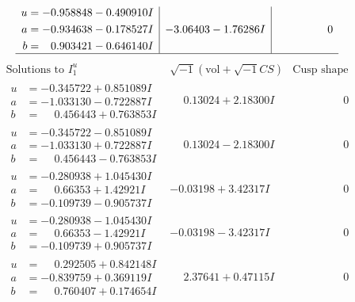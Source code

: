 \documentclass[1p]{elsarticle_modified}
\theoremstyle{definition}
\newcommand{\I}{\sqrt{-1}}
\begin{document}
$$\begin{array}{c|c|c}
\begin{aligned}
u &= -0.958848 - 0.490910 I \\
a &= -0.934638 - 0.178527 I \\
b &= \phantom{-}0.903421 - 0.646140 I\end{aligned}
 & -3.06403 - 1.76286 I & \phantom{-0.000000 } 0\\
 \hline 
 \end{array}$$\newpage$$\begin{array}{c|c|c}  
\text{Solutions to }I^u_{1}& \I (\text{vol} + \sqrt{-1}CS) & \text{Cusp shape}\\
 \hline 
\begin{aligned}
u &= -0.345722 + 0.851089 I \\
a &= -1.033130 - 0.722887 I \\
b &= \phantom{-}0.456443 + 0.763853 I\end{aligned}
 & \phantom{-}0.13024 + 2.18300 I & \phantom{-0.000000 } 0 \\ \hline\begin{aligned}
u &= -0.345722 - 0.851089 I \\
a &= -1.033130 + 0.722887 I \\
b &= \phantom{-}0.456443 - 0.763853 I\end{aligned}
 & \phantom{-}0.13024 - 2.18300 I & \phantom{-0.000000 } 0 \\ \hline\begin{aligned}
u &= -0.280938 + 1.045430 I \\
a &= \phantom{-}0.66353 + 1.42921 I \\
b &= -0.109739 - 0.905737 I\end{aligned}
 & -0.03198 + 3.42317 I & \phantom{-0.000000 } 0 \\ \hline\begin{aligned}
u &= -0.280938 - 1.045430 I \\
a &= \phantom{-}0.66353 - 1.42921 I \\
b &= -0.109739 + 0.905737 I\end{aligned}
 & -0.03198 - 3.42317 I & \phantom{-0.000000 } 0 \\ \hline\begin{aligned}
u &= \phantom{-}0.292505 + 0.842148 I \\
a &= -0.839759 + 0.369119 I \\
b &= \phantom{-}0.760407 + 0.174654 I\end{aligned}
 & \phantom{-}2.37641 + 0.47115 I & \phantom{-0.000000 } 0 \\ \hline\begin{aligned}

\end{aligned}
\end{array}$$
\end{document}

